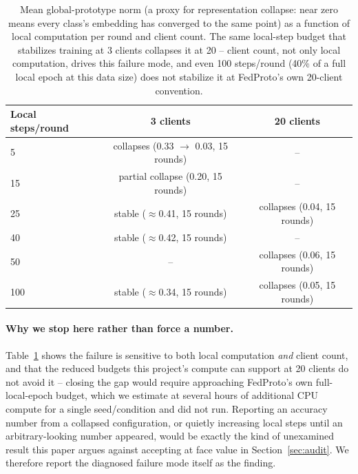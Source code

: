 \documentclass{article}
\begin{document}
\begin{table}[t]
\centering\small
\begin{tabular}{lcc}
\toprule
Local steps/round & 3 clients & 20 clients \\
\midrule
5 & collapses (0.33 $\to$ 0.03, 15 rounds) & -- \\
15 & partial collapse (0.20, 15 rounds) & -- \\
25 & stable ($\approx$0.41, 15 rounds) & collapses (0.04, 15 rounds) \\
40 & stable ($\approx$0.42, 15 rounds) & -- \\
50 & -- & collapses (0.06, 15 rounds) \\
100 & stable ($\approx$0.34, 15 rounds) & collapses (0.05, 15 rounds) \\
\bottomrule
\end{tabular}
\caption{Mean global-prototype norm (a proxy for representation collapse: near
zero means every class's embedding has converged to the same point) as a
function of local computation per round and client count. The same local-step
budget that stabilizes training at 3 clients collapses it at 20 -- client count,
not only local computation, drives this failure mode, and even 100 steps/round
(40\% of a full local epoch at this data size) does not stabilize it at
FedProto's own 20-client convention.}
\label{tab:fedproto-diagnostic}
\end{table}

\paragraph{Why we stop here rather than force a number.} Table~\ref{tab:fedproto-diagnostic}
shows the failure is sensitive to both local computation \emph{and} client
count, and that the reduced budgets this project's compute can support at 20
clients do not avoid it -- closing the gap would require approaching FedProto's
own full-local-epoch budget, which we estimate at several hours of additional
CPU compute for a single seed/condition and did not run. Reporting an accuracy
number from a collapsed configuration, or quietly increasing local steps until
an arbitrary-looking number appeared, would be exactly the
kind of unexamined result this paper argues against accepting at face value in
Section~\ref{sec:audit}. We therefore report the diagnosed failure mode itself
as the finding.
\end{document}
